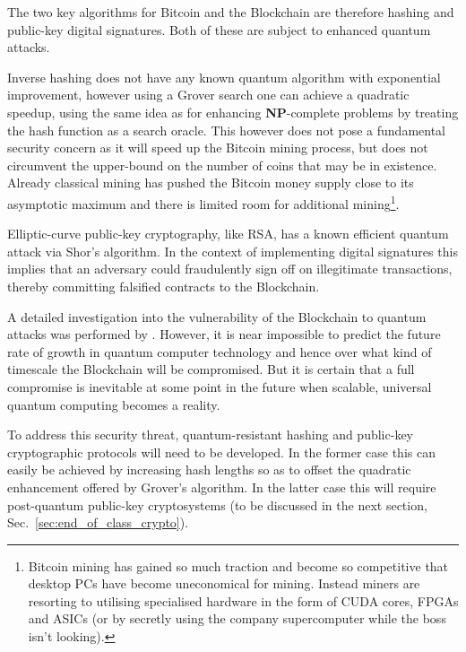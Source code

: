 The two key algorithms for Bitcoin and the Blockchain are therefore hashing and public-key digital signatures. Both of these are subject to enhanced quantum attacks.

Inverse hashing does not have any known quantum algorithm with exponential improvement, however using a Grover search one can achieve a quadratic speedup, using the same idea as for enhancing \textbf{NP}-complete problems by treating the hash function as a search oracle. This however does not pose a fundamental security concern as it will speed up the Bitcoin mining process, but does not circumvent the upper-bound on the number of coins that may be in existence. Already classical mining has pushed the Bitcoin money supply close to its asymptotic maximum and there is limited room for additional mining\footnote{Bitcoin mining has gained so much traction and become so competitive that desktop PCs have become uneconomical for mining. Instead miners are resorting to utilising specialised hardware in the form of CUDA cores, FPGAs and ASICs (or by secretly using the company supercomputer while the boss isn't looking).}.

Elliptic-curve public-key cryptography, like RSA, has a known efficient quantum attack via Shor's algorithm. In the context of implementing digital signatures this implies that an adversary could fraudulently sign off on illegitimate transactions, thereby committing falsified contracts to the Blockchain.

A detailed investigation into the vulnerability of the Blockchain to quantum attacks was performed by \cite{bib:TomamichelBlockchain}. However, it is near impossible to predict the future rate of growth in quantum computer technology and hence over what kind of timescale the Blockchain will be compromised. But it is certain that a full compromise is inevitable at some point in the future when scalable, universal quantum computing becomes a reality.

To address this security threat, quantum-resistant hashing and public-key cryptographic protocols will need to be developed. In the former case this can easily be achieved by increasing hash lengths so as to offset the quadratic enhancement offered by Grover's algorithm. In the latter case this will require post-quantum public-key cryptosystems (to be discussed in the next section, Sec.~\ref{sec:end_of_class_crypto}).

